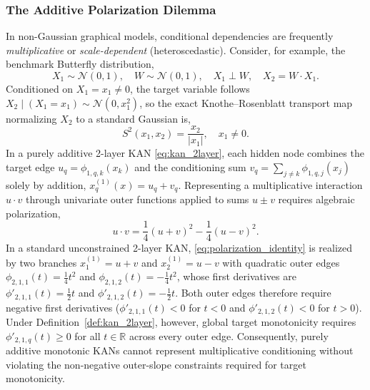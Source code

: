 \documentclass[11pt,a4paper]{article}
\theoremstyle{plain}
\theoremstyle{definition}
\theoremstyle{remark}
\begin{document}
\subsubsection{The Additive Polarization Dilemma}
In non-Gaussian graphical models, conditional dependencies are frequently \emph{multiplicative} or \emph{scale-dependent} (heteroscedastic). Consider, for example, the benchmark Butterfly distribution,
\begin{equation}
    X_1 \sim \mathcal{N}(0, 1), \quad W \sim \mathcal{N}(0, 1), \quad X_1 \perp W, \quad X_2 = W \cdot X_1.
    \label{eq:butterfly_def}
\end{equation}
Conditioned on $X_1 = x_1 \neq 0$, the target variable follows $X_2 \mid (X_1 = x_1) \sim \mathcal{N}(0, x_1^2)$, so the exact Knothe--Rosenblatt transport map normalizing $X_2$ to a standard Gaussian is,
\begin{equation}
    S^2(x_1, x_2) = \frac{x_2}{|x_1|}, \quad x_1 \neq 0.
    \label{eq:butterfly_ideal_map}
\end{equation}
In a purely additive 2-layer KAN \eqref{eq:kan_2layer}, each hidden node combines the target edge $u_q = \phi_{1, q, k}(x_k)$ and the conditioning sum $v_q = \sum_{j \neq k} \phi_{1, q, j}(x_j)$ solely by addition, $x^{(1)}_q(x) = u_q + v_q$. Representing a multiplicative interaction $u \cdot v$ through univariate outer functions applied to sums $u \pm v$ requires algebraic polarization,
\begin{equation}
    u \cdot v = \frac{1}{4}(u + v)^2 - \frac{1}{4}(u - v)^2.
    \label{eq:polarization_identity}
\end{equation}
In a standard unconstrained 2-layer KAN, \eqref{eq:polarization_identity} is realized by two branches $x^{(1)}_1 = u + v$ and $x^{(1)}_2 = u - v$ with quadratic outer edges $\phi_{2, 1, 1}(t) = \frac{1}{4}t^2$ and $\phi_{2, 1, 2}(t) = -\frac{1}{4}t^2$, whose first derivatives are $\phi'_{2, 1, 1}(t) = \frac{1}{2}t$ and $\phi'_{2, 1, 2}(t) = -\frac{1}{2}t$. Both outer edges therefore require negative first derivatives ($\phi'_{2, 1, 1}(t) < 0$ for $t < 0$ and $\phi'_{2, 1, 2}(t) < 0$ for $t > 0$). Under Definition~\ref{def:kan_2layer}, however, global target monotonicity requires $\phi'_{2, 1, q}(t) \ge 0$ for all $t \in \mathbb{R}$ across every outer edge. Consequently, purely additive monotonic KANs cannot represent multiplicative conditioning without violating the non-negative outer-slope constraints required for target monotonicity.
\end{document}
